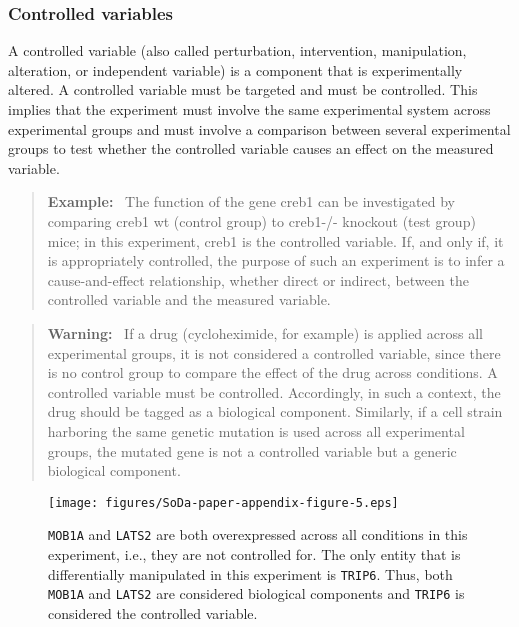 \documentclass{bioinfo}
\newenvironment{example}
{\par\color{black}\begin{quote}\textbf{Example:}\ }
{\end{quote}\par}
\newenvironment{warning}
{\par\color{black}\begin{quote}\textbf{Warning:}\ }
{\end{quote}\par}
\begin{document}
\subsubsection{Controlled variables}\label{app:controlled-variables}
A controlled variable (also called perturbation, intervention, manipulation, alteration, or independent variable) is a component that is experimentally altered. A controlled variable must be targeted and must be controlled. This implies that the experiment must involve the same experimental system across experimental groups and must involve a comparison between several experimental groups to test whether the controlled variable causes an effect on the measured variable.

\begin{example}
    The function of the gene creb1 can be investigated by comparing creb1 wt (control group) to creb1-/- knockout (test group) mice; in this experiment, creb1 is the controlled variable. If, and only if, it is appropriately controlled, the purpose of such an experiment is to infer a cause-and-effect relationship, whether direct or indirect, between the controlled variable and the measured variable.
\end{example}

\begin{warning}
    If a drug (cycloheximide, for example) is applied across all experimental groups, it is not considered a controlled variable, since there is no control group to compare the effect of the drug across conditions. A controlled variable must be controlled. Accordingly, in such a context, the drug should be tagged as a biological component. Similarly, if a cell strain harboring the same genetic mutation is used across all experimental groups, the mutated gene is not a controlled variable but a generic biological component.
\end{warning}

\begin{figure*}
    \centering
    \texttt{[image: figures/SoDa-paper-appendix-figure-5.eps]}
    \caption{\texttt{MOB1A} and \texttt{LATS2} are both overexpressed across all conditions in this experiment, i.e., they are not controlled for. The only entity that is differentially manipulated in this experiment is \texttt{TRIP6}. Thus, both \texttt{MOB1A} and \texttt{LATS2} are considered biological components and \texttt{TRIP6} is considered the controlled variable.}
    \label{fig:biological_component}
\end{figure*}
\end{document}
